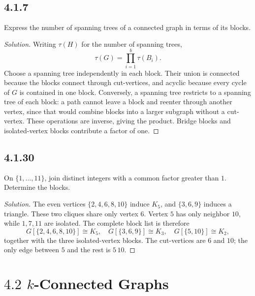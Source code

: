 \documentclass[12pt]{amsart}
\newenvironment{solution}{\begin{proof}[Solution]}{\end{proof}}
\begin{document}
    \subsection*{4.1.7} Express the number of spanning trees of a connected graph in terms of its blocks.
    \begin{solution}Writing $\tau(H)$ for the number of spanning trees,
        \[
            \tau(G)=\prod_{i=1}^{b}\tau(B_i).
        \]
        Choose a spanning tree independently in each block. Their union is connected because the blocks connect through cut-vertices, and acyclic because every cycle of $G$ is contained in one block. Conversely, a spanning tree restricts to a spanning tree of each block: a path cannot leave a block and reenter through another vertex, since that would combine blocks into a larger subgraph without a cut-vertex. These operations are inverse, giving the product. Bridge blocks and isolated-vertex blocks contribute a factor of one.\end{solution}

    \subsection*{4.1.30} On $\{1,\ldots,11\}$, join distinct integers with a common factor greater than $1$. Determine the blocks.
    \begin{solution}The even vertices $\{2,4,6,8,10\}$ induce $K_5$, and $\{3,6,9\}$ induces a triangle. These two cliques share only vertex $6$. Vertex $5$ has only neighbor $10$, while $1,7,11$ are isolated. The complete block list is therefore
        \[
            G[\{2,4,6,8,10\}]\cong K_5,\quad
            G[\{3,6,9\}]\cong K_3,\quad
            G[\{5,10\}]\cong K_2,
        \]
        together with the three isolated-vertex blocks. The cut-vertices are $6$ and $10$; the only edge between $5$ and the rest is $5\,10$.\end{solution}

    \section*{$4.2$ $k$-Connected Graphs}
\end{document}
